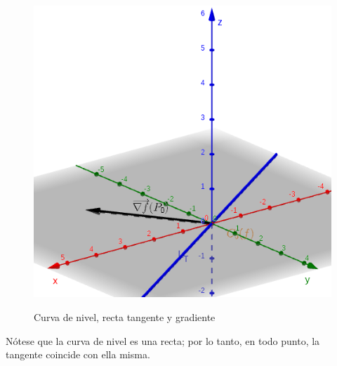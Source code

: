 \documentclass{article}
\begin{document}
\begin{figure}[ht]
\caption{Curva de nivel, recta tangente y gradiente}
\includegraphics[scale=0.35]{img/ejercicios/3/1-c-2.png} 
\centering
\label{fig:1-c-2}
\end{figure}

Nótese que la curva de nivel es una recta; por lo tanto, en todo punto, la tangente coincide con ella misma.
\end{document}
